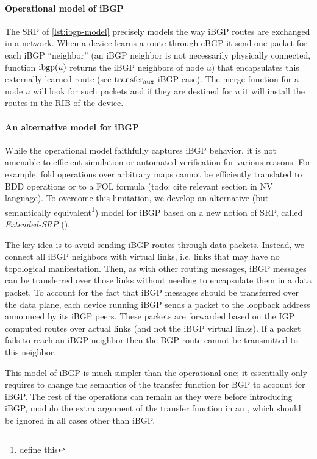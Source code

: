 \documentclass[sigconf,10pt]{acmart}
\begin{document}
\paragraph{Operational model of iBGP}
The SRP of \ref{lst:ibgp-model} precisely models the way iBGP
routes are exchanged in a network. When a device learns a route
through eBGP it send one packet for each iBGP ``neighbor'' (an iBGP
neighbor is not necessarily physically connected, function $\mathrm{ibgp}(u)$
returns the iBGP neighbors of node $u$) that encapsulates this
externally learned route (see $\mathrm{transfer}_{\mathrm{aux}}$ iBGP case). The merge
function for a node $u$ will look for such packets and if they are
destined for $u$ it will install the routes in the RIB of the device.

\paragraph{An alternative model for iBGP}

While the operational model faithfully captures iBGP behavior, it is
not amenable to efficient simulation or automated verification for
various reasons. For example, fold operations over arbitrary maps
cannot be efficiently translated to BDD operations or to a FOL formula
(todo: cite relevant section in NV language). To overcome this
limitation, we develop an alternative (but semantically
equivalent\footnote{define this}) model for iBGP based on a new notion
of SRP, called \emph{Extended-SRP} (\ESRP).

The key idea is to avoid sending iBGP routes through data packets.
Instead, we connect all iBGP neighbors with virtual links, i.e. links
that may have no topological manifestation. Then, as with other
routing messages, iBGP messages can be transferred over those links
without needing to encapsulate them in a data packet. To account for
the fact that iBGP messages should be transferred over the data plane,
each device running iBGP sends a packet to the loopback address
announced by its iBGP peers. These packets are forwarded based on the
IGP computed routes over actual links (and not the iBGP virtual
links). If a packet fails to reach an iBGP neighbor then the BGP
route cannot be transmitted to this neighbor.

This model of iBGP is much simpler than the operational one; it
essentially only requires to change the semantics of the transfer
function for BGP to account for iBGP. The rest of the operations can
remain as they were before introducing iBGP, modulo the extra argument
of the transfer function in an \ESRP, which should be ignored in all cases other than iBGP.
\end{document}
